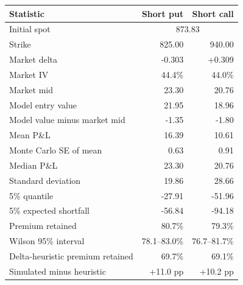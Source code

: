 \begin{tabular}{lrr}\toprule
Statistic & Short put & Short call \\\midrule
Initial spot & \multicolumn{2}{c}{873.83} \\
Strike & 825.00 & 940.00 \\
Market delta & -0.303 & +0.309 \\
Market IV & 44.4\% & 44.0\% \\
Market mid & 23.30 & 20.76 \\
Model entry value & 21.95 & 18.96 \\
Model value minus market mid & -1.35 & -1.80 \\
Mean P\&L & 16.39 & 10.61 \\
Monte Carlo SE of mean & 0.63 & 0.91 \\
Median P\&L & 23.30 & 20.76 \\
Standard deviation & 19.86 & 28.66 \\
5\% quantile & -27.91 & -51.96 \\
5\% expected shortfall & -56.84 & -94.18 \\
Premium retained & 80.7\% & 79.3\% \\
Wilson 95\% interval & 78.1--83.0\% & 76.7--81.7\% \\
Delta-heuristic premium retained & 69.7\% & 69.1\% \\
Simulated minus heuristic & +11.0 pp & +10.2 pp \\
\bottomrule\end{tabular}
